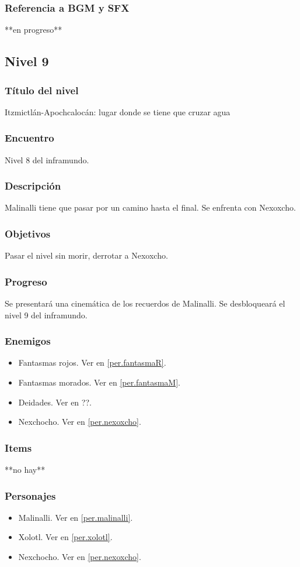 \documentclass[11pt,letterpaper]{article}
\begin{document}
	\subsubsection{Referencia a BGM y SFX}
	**en progreso**
	
		\subsection{Nivel 9}
	\subsubsection{Título del nivel}
	Itzmictlán-Apochcalocán: lugar donde se tiene que cruzar agua
	\subsubsection{Encuentro}
	Nivel 8 del inframundo.
	\subsubsection{Descripción}
	Malinalli tiene que pasar por un camino hasta el final. Se enfrenta con Nexoxcho.
	\subsubsection{Objetivos}
	Pasar el nivel  sin morir, derrotar a Nexoxcho.
	\subsubsection{Progreso}
	Se presentará una cinemática de los recuerdos de Malinalli. Se desbloqueará el nivel 9 del inframundo. 
	\subsubsection{Enemigos}
	\begin{itemize}
		\item Fantasmas rojos. Ver en \ref{per.fantasmaR}.
		\item Fantasmas morados. Ver en \ref{per.fantasmaM}.
		\item Deidades. Ver en ??.
		\item Nexchocho. Ver en \ref{per.nexoxcho}.
	\end{itemize}
	\subsubsection{Items}
	**no hay**
	\subsubsection{Personajes}
	\begin{itemize}
		\item Malinalli. Ver en \ref{per.malinalli}.
		\item Xolotl. Ver en \ref{per.xolotl}.
		\item Nexchocho. Ver en \ref{per.nexoxcho}.
	\end{itemize}
\end{document}
